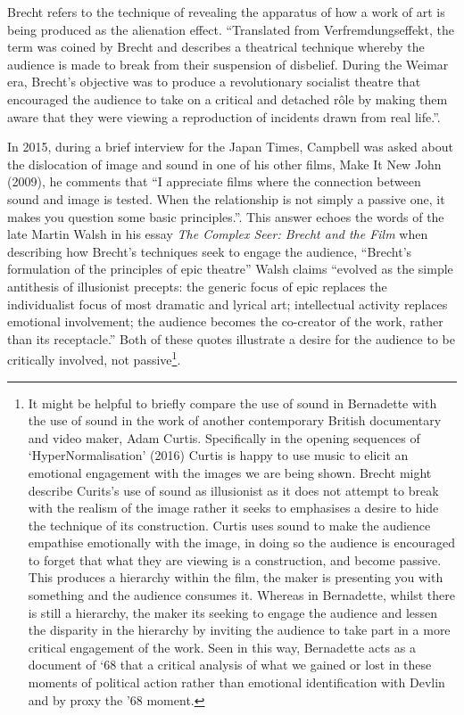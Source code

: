 \documentclass[12pt]{article}
\begin{document}
Brecht refers to the technique of revealing the apparatus of how a work of art is being produced as the alienation effect. ``Translated from Verfremdungseffekt, the term was coined by Brecht and describes a theatrical technique whereby the audience is made to break from their suspension of disbelief. During the Weimar era, Brecht's objective was to produce a revolutionary socialist theatre that encouraged the audience to take on a critical and detached r\^{o}le by making them aware that they were viewing a reproduction of incidents drawn from real life.''\cite[Alienation effect]{Macey:2000aa}.

In 2015, during a brief interview for the Japan Times, Campbell was asked about the dislocation of image and sound in one of his other films, Make It New John (2009), he comments that ``I appreciate films where the connection between sound and image is tested. When the relationship is not simply a passive one, it makes you question some basic principles.''\cite{Yamada:2015aa}. This answer echoes the words of the late Martin Walsh in his essay \textit{The Complex Seer: Brecht and the Film} \citeyear{Walsh:1981aa} when describing how Brecht's techniques seek to engage the audience, ``Brecht's formulation of the principles of epic theatre'' Walsh claims ``evolved as the simple antithesis of illusionist precepts: the generic focus of epic replaces the individualist focus of most dramatic and lyrical art; intellectual activity replaces emotional involvement; the audience becomes the co-creator of the work, rather than its receptacle.'' Both of these quotes illustrate a desire for the audience to be critically involved, not passive\footnote{It might be helpful to briefly compare the use of sound in Bernadette with the use of sound in the work of another contemporary British documentary and video maker, Adam Curtis. Specifically in the opening sequences of `HyperNormalisation' (2016) Curtis is happy to use music to elicit an emotional engagement with the images we are being shown. Brecht might describe Curits’s use of sound as illusionist as it does not attempt to break with the realism of the image rather it seeks to emphasises a desire to hide the technique of its construction. Curtis uses sound to make the audience empathise emotionally with the image, in doing so the audience is encouraged to forget that what they are viewing is a construction, and become passive. This produces a hierarchy within the film, the maker is presenting you with something and the audience consumes it. Whereas in Bernadette, whilst there is still a hierarchy, the maker its seeking to engage the audience and lessen the disparity in the hierarchy by inviting the audience to take part in a more critical engagement of the work. Seen in this way, Bernadette acts as a document of ‘68 that a critical analysis of what we gained or lost in these moments of political action rather than emotional identification with Devlin and by proxy the ’68 moment.}.
\end{document}
